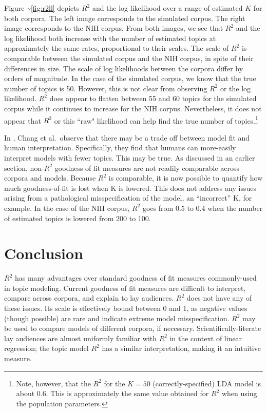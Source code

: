 \documentclass[conference,final,]{IEEEtran}
\begin{document}
Figure \textasciitilde{}\ref{fig:r2ll} depicts \(R^2\) and the log
likelihood over a range of estimated \(K\) for both corpora. The left
image corresponds to the simulated corpus. The right image corresponds
to the NIH corpus. From both images, we see that \(R^2\) and the log
likelihood both increase with the number of estimated topics at
approximately the same rates, proportional to their scales. The scale of
\(R^2\) is comparable between the simulated corpus and the NIH corpus,
in spite of their differences in size. The scale of log likelihoods
between the corpora differ by orders of magnitude. In the case of the
simulated corpus, we know that the true number of topics is 50. However,
this is not clear from observing \(R^2\) or the log likelihood. \(R^2\)
does appear to flatten between 55 and 60 topics for the simulated corpus
while it continues to increase for the NIH corpus. Nevertheless, it does
not appear that \(R^2\) or this ``raw" likelihood can help find the true
number of
topics.\footnote{Note, however, that the $R^2$ for the $K = 50$ (correctly-specified) LDA model is about 0.6. This is approximately the same value obtained for $R^2$ when using the population parameters.}

In \cite{chang09}, Chang et al.~observe that there may be a trade off
between model fit and human interpretation. Specifically, they find that
humans can more-easily interpret models with fewer topics. This may be
true. As discussed in an earlier section, non-\(R^2\) goodness of fit
measures are not readily comparable across corpora and models. Because
\(R^2\) is comparable, it is now possible to quantify how much
goodness-of-fit is lost when K is lowered. This does not address any
issues arising from a pathological misspecification of the model, an
``incorrect'' K, for example. In the case of the NIH corpus, \(R^2\)
goes from 0.5 to 0.4 when the number of estimated topics is lowered from
200 to 100.

\hypertarget{conclusion}{%
\section{Conclusion}\label{conclusion}}

\(R^2\) has many advantages over standard goodness of fit measures
commonly-used in topic modeling. Current goodness of fit measures are
difficult to interpret, compare across corpora, and explain to lay
audiences. \(R^2\) does not have any of these issues. Its scale is
effectively bound between 0 and 1, as negative values (though possible)
are rare and indicate extreme model misspecification. \(R^2\) may be
used to compare models of different corpora, if necessary.
Scientifically-literate lay audiences are almost uniformly familiar with
\(R^2\) in the context of linear regression; the topic model \(R^2\) has
a similar interpretation, making it an intuitive measure.
\end{document}
